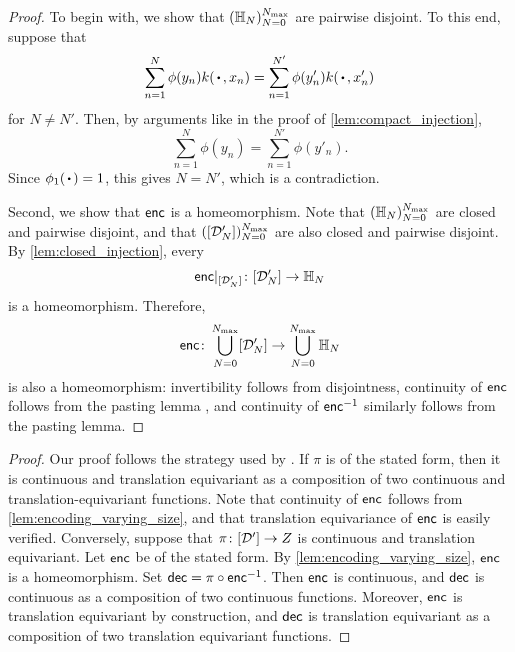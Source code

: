 \documentclass[12pt, twoside]{report}
\begin{document}
\begin{proof}
    To begin with, we show that
    $(\Hb_{N})_{N=0}^{N\ss{max}}$ are pairwise disjoint.
    To this end, suppose that
    \begin{equation}
        \sum_{n=1}^{N} \phi(y_n) k(\vardot, x_n)
        = \sum_{n=1}^{N'} \phi(y'_n) k(\vardot, x'_n)
    \end{equation}
    for $N \neq N'$.
    Then, by arguments like in the proof of \cref{lem:compact_injection},
    \begin{equation}
        \sum_{n=1}^N \phi(y_n)
        = \sum_{n=1}^{N'} \phi(y'_n).
    \end{equation}
    Since $\phi_1(\vardot)=1$, this gives $N = N'$, which is a contradiction.

    Second, we show that $\mathsf{enc}$ is a homeomorphism.
    Note that
    $(\Hb_{N})_{N=0}^{N\ss{max}}$ are closed and pairwise disjoint,
    and that $([\D'_N])_{N=0}^{N\ss{max}}$ are also closed and pairwise disjoint.
    By \cref{lem:closed_injection}, every
    \begin{equation}
        \mathsf{enc}|_{[\mathcal{D}'_N]} \colon [\mathcal{D}'_N] \to \mathbb{H}_N
    \end{equation}
    is a homeomorphism.
    Therefore,
    \begin{equation}
        \enc \colon \union_{N=0}^{N\ss{max}} [\D'_N] \to  \union_{N=0}^{N\ss{max}} \Hb_{N}
    \end{equation}
    is also a homeomorphism:
    invertibility follows from disjointness,
    continuity of $\mathsf{enc}$ follows from the pasting lemma \parencite[Theorem 18.3;][]{Munkres:2000:Topology},
    and continuity of $\mathsf{enc}^{-1}$ similarly follows from the pasting lemma.
\end{proof}

\begin{proof}
    Our proof follows the strategy used by \textcite{Zaheer:2017:Deep_Sets}.
    If $\pi$ is of the stated form, then it is continuous and translation equivariant as a composition of two continuous and translation-equivariant functions.
    Note that continuity of $\mathsf{enc}$ follows from \cref{lem:encoding_varying_size},
    and that translation equivariance of $\mathsf{enc}$ is easily verified.
    Conversely, suppose that $\pi \colon [\mathcal{D}'] \to Z$ is continuous and translation equivariant.
    Let $\mathsf{enc}$ be of the stated form.
    By \cref{lem:encoding_varying_size}, $\mathsf{enc}$ is a homeomorphism.
    Set $\mathsf{dec} = \pi \circ \mathsf{enc}^{-1}$.
    Then $\mathsf{enc}$ is continuous,
    and $\mathsf{dec}$ is continuous as a composition of two continuous functions.
    Moreover, $\mathsf{enc}$ is translation equivariant by construction, and $\mathsf{dec}$ is translation equivariant as a composition of two translation equivariant functions.
\end{proof}
\end{document}
